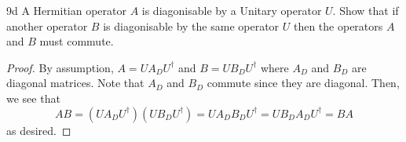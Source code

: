 \documentclass[12pt]{article}
\begin{document}
\begin{exc}{9d}
    A Hermitian operator $A$ is diagonisable by a Unitary operator $U$. Show
that if another operator $B$ is diagonisable by the same operator $U$ then
the operators $A$ and $B$ must commute.
\end{exc}
\begin{proof}
    By assumption, $A = UA_DU^\dagger$ and $B = UB_D U^\dagger$ where $A_D$ and $B_D$ are diagonal matrices. Note that $A_D$ and $B_D$ commute since they are diagonal. Then, we see that 
    \[AB = (UA_DU^\dagger)(UB_D U^\dagger) = UA_DB_DU^\dagger = UB_DA_DU^\dagger = BA\]
    as desired.
\end{proof}
\end{document}

